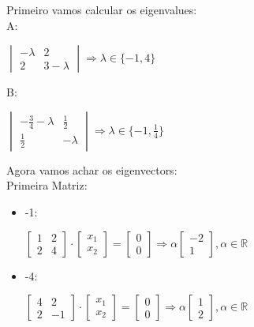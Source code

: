 \documentclass[12pt]{article}
\newcommand{\real}{\mathbb{R}}
\begin{document}
Primeiro vamos calcular os eigenvalues:\\
A:
\begin{center}
  $
  \begin{vmatrix}
    -\lambda & 2 \\
    2 & 3-\lambda
  \end{vmatrix}\Rightarrow \lambda \in \{-1,4\}
  $
\end{center}
B:
\begin{center}
  $
  \begin{vmatrix}
    -\frac{3}{4}-\lambda & \frac{1}{2} \\
    \frac{1}{2} & -\lambda
  \end{vmatrix}\Rightarrow \lambda \in \{-1,\frac{1}{4}\}
  $
\end{center}
Agora vamos achar os eigenvectors:\\
Primeira Matriz:
\begin{itemize}
\item -1:
  \begin{center}
    $
    \begin{bmatrix}
      1 & 2 \\
      2 & 4
    \end{bmatrix}\cdot
    \begin{bmatrix}
      x_1 \\ x_2
    \end{bmatrix}=
    \begin{bmatrix}
      0 \\ 0
    \end{bmatrix}\Rightarrow \alpha
    \begin{bmatrix}
      -2 \\ 1
    \end{bmatrix}, \alpha \in \real
    $
  \end{center}
\item -4:
  \begin{center}
    $
    \begin{bmatrix}
      4 & 2 \\
      2 & -1
    \end{bmatrix}\cdot
    \begin{bmatrix}
      x_1 \\ x_2
    \end{bmatrix}=
    \begin{bmatrix}
      0 \\ 0
    \end{bmatrix}\Rightarrow \alpha
    \begin{bmatrix}
      1 \\ 2
    \end{bmatrix}, \alpha \in \real
    $
  \end{center}
\end{itemize}
\end{document}
